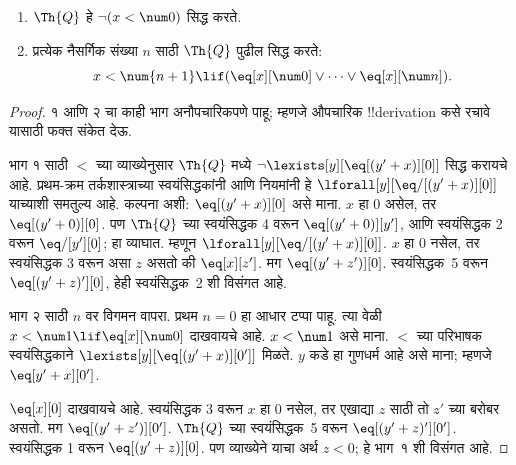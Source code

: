 \documentclass[../../../include/open-logic-section]{subfiles}
\begin{document}
\begin{lem}
\begin{enumerate}
\item $\Th{Q}$ हे $\lnot (x < \num 0)$ सिद्ध करते.
\item प्रत्येक नैसर्गिक संख्या $n$ साठी $\Th{Q}$ पुढील सिद्ध करते:
\[
x < \num {n+1} \lif (\eq[x][\num 0] \lor \dots \lor \eq[x][\num n]).
\]
\end{enumerate}
\end{lem}

\begin{proof}
१ आणि २ चा काही भाग अनौपचारिकपणे पाहू; म्हणजे औपचारिक
!!{derivation} कसे रचावे यासाठी फक्त संकेत देऊ.

भाग १ साठी $<$ च्या व्याख्येनुसार $\Th{Q}$ मध्ये
$\lnot \lexists[y][\eq[(y'+x)][0]]$ सिद्ध करायचे आहे. प्रथम-क्रम
तर्कशास्त्राच्या स्वयंसिद्धकांनी आणि नियमांनी हे
$\lforall[y][\eq/[(y' +
    x)][0]]$ याच्याशी समतुल्य आहे. कल्पना अशी: $\eq[(y'+x)][0]$
असे माना. $x$ हा 0 असेल, तर $\eq[(y' + 0)][0]$.
पण $\Th{Q}$ च्या स्वयंसिद्धक 4 वरून
$\eq[(y' + 0)][y']$, आणि स्वयंसिद्धक 2 वरून
$\eq/[y'][0]$; हा व्याघात. म्हणून
$\lforall[y][\eq/[(y' +x)][0]]$. $x$ हा $0$ नसेल,
तर स्वयंसिद्धक 3 वरून असा $z$ असतो की
$\eq[x][z']$. मग $\eq[(y' + z')][0]$.
स्वयंसिद्धक~5 वरून $\eq[(y' + z)'][0]$, हेही
स्वयंसिद्धक~2 शी विसंगत आहे.

भाग २ साठी $n$ वर विगमन वापरा. प्रथम $n =0$
हा आधार टप्पा पाहू. त्या वेळी
$x < \num 1 \lif \eq[x][\num
  0]$ दाखवायचे आहे. $x < \num 1$ असे माना.
$<$ च्या परिभाषक स्वयंसिद्धकाने
$\lexists[y][\eq[(y'+x)][0']]$ मिळते. $y$ कडे हा
गुणधर्म आहे असे माना; म्हणजे $\eq[y'+x][0']$.

$\eq[x][0]$ दाखवायचे आहे. स्वयंसिद्धक 3 वरून
$x$ हा 0 नसेल, तर एखाद्या $z$ साठी तो $z'$ च्या
बरोबर असतो. मग $\eq[(y' + z')][0']$.
$\Th{Q}$ च्या स्वयंसिद्धक~5 वरून
$\eq[(y'+z)'][0']$. स्वयंसिद्धक 1 वरून
$\eq[(y' +
    z)][0]$. पण व्याख्येने याचा अर्थ
$z < 0$; हे भाग~१ शी विसंगत आहे.
\end{proof}
\end{document}
